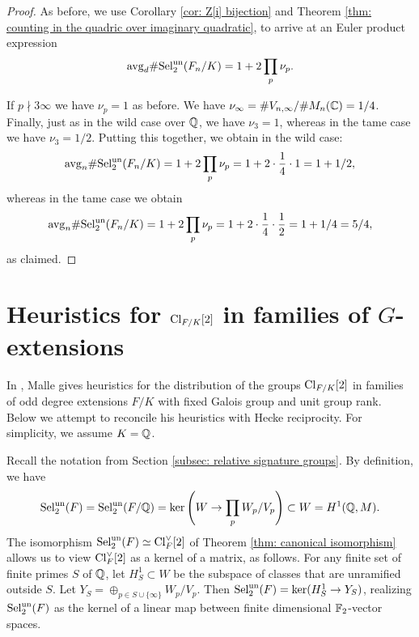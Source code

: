 \documentclass[11pt,a4paper]{amsart}
\def\F{{\rm \mathbb{F}}}
\def\Q{{\rm \mathbb{Q}}}
\def\C{{\rm \mathbb{C}}}
\def\un{{\rm un}}
\def\avg{{\rm avg}}
\def\Cl{{\rm Cl}}
\def\Sel{{\rm Sel}}
\numberwithin{equation}{section}
\begin{document}
\begin{proof}
As before, we use Corollary \ref{cor: Z[i] bijection} and Theorem \ref{thm: counting in the quadric over imaginary quadratic}, to arrive at an Euler product expression
\[\avg_d \#\Sel_2^\un(F_n/K) = 1 + 2\prod_p \nu_p.\] 

If $p \nmid 3\infty$ we have $\nu_p = 1$ as before.  
We have $\nu_\infty = \#V_{n,\infty}/\#M_n(\C) =1/4$. Finally, just as in the wild case over $\Q$, we have $\nu_3 = 1$, whereas in the tame  case we have $\nu_3 = 1/2$. Putting this together, we obtain in the wild case:
\[\avg_n \#\Sel_2^\un(F_n/K) = 1 + 2\prod_p \nu_p =1 + 2\cdot \frac14 \cdot 1=  1 + 1/2,\]
whereas in the tame case we obtain
\[\avg_n \#\Sel_2^\un(F_n/K) = 1 + 2\prod_p \nu_p =1 + 2\cdot \frac14 \cdot \frac12=  1 + 1/4 = 5/4,\]
as claimed.
\end{proof}

\section{Heuristics for $\Cl_{F/K}[2]$ in families of $G$-extensions} \label{sec: random model for Cl[2]}



In \cite{Malle2010}, Malle gives heuristics for the distribution of the groups $\Cl_{F/K}[2]$ in families of odd degree extensions $F/K$ with fixed Galois group and unit group rank.  Below we attempt to reconcile his heuristics with Hecke reciprocity. For simplicity, we assume $K = \Q$. 

 Recall the notation from Section \ref{subsec: relative signature groups}. By definition, we have 
 \[\Sel_2^\un(F) = \Sel_2^\un(F/\Q) = \ker\left(W \to \prod_p W_p/V_p\right) \subset  W = H^1(\Q,M).\] 
 The isomorphism $\Sel_2^\un(F) \simeq \Cl_F^\vee[2]$ of Theorem \ref{thm: canonical isomorphism} allows us to view $\Cl_F^\vee[2]$ as a kernel of a matrix, as follows. For any finite set of finite primes $S$ of $\Q$, let $H^1_S \subset W$ be the subspace of classes that are unramified outside $S$. Let $Y_S = \oplus_{p \in S \cup \{\infty\}} W_p/V_p$.  Then $\Sel_2^\un(F) = \ker(H^1_S \to Y_S)$, realizing $\Sel_2^\un(F)$ as the kernel of a linear map between finite dimensional $\F_2$-vector spaces.
\end{document}
